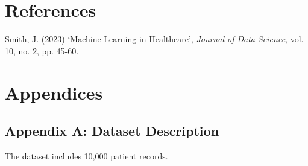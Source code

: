 \documentclass[12pt,a4paper]{article}
\begin{document}
\newpage
\section*{References}
\begin{thebibliography}{9}
 Smith, J. (2023) `Machine Learning in Healthcare', \textit{Journal of Data Science}, vol. 10, no. 2, pp. 45-60.
\end{thebibliography}

\newpage
\section*{Appendices}
\subsection*{Appendix A: Dataset Description}
The dataset includes 10,000 patient records.
\end{document}
